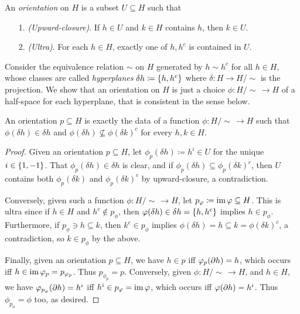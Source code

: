 \documentclass{amsart}
\begin{document}
    \begin{definition}
        An \textit{orientation} on $H$ is a subset $U\subseteq H$ such that
        \begin{enumerate}
            \item[1.] \textit{(Upward-closure)}. If $h\in U$ and $k\in H$ contains $h$, then $k\in U$.
            \item[2.] \textit{(Ultra)}. For each $h\in H$, exactly one of $h,h^c$ is contained in $U$.
        \end{enumerate}
    \end{definition}

    Consider the equivalence relation $\sim$ on $H$ generated by $h\sim h^c$ for all $h\in H$, whose classes are called \textit{hyperplanes} $\delta h\coloneqq\left\{h,h^c\right\}$ where $\delta:H\to H/\!\sim$ is the projection. We show that an orientation on $H$ is just a choice $\phi:H/\!\sim\,\to H$ of a half-space for each hyperplane, that is consistent in the sense below.

    \begin{proposition}
        An orientation $p\subseteq H$ is exactly the data of a function $\phi:H/\!\sim\,\to H$ such that $\phi(\delta h)\in\delta h$ and $\phi(\delta h)\not\subseteq\phi(\delta k)^c$ for every $h,k\in H$.
    \end{proposition}
    \begin{proof}
        Given an orientation $p\subseteq H$, let $\phi_p(\delta h)\coloneqq h^i\in U$ for the unique $i\in\left\{1,-1\right\}$. That $\phi_p(\delta h)\in\delta h$ is clear, and if $\phi_p(\delta h)\subseteq\phi_p(\delta k)^c$, then $U$ contains both $\phi_p(\delta k)$ and $\phi_p(\delta k)^c$ by upward-closure, a contradiction.

        Conversely, given such a function $\phi:H/\!\sim\,\to H$, let $p_\varphi\coloneqq\operatorname{im}\varphi\subseteq H$. This is ultra since if $h\in H$ and $h^c\not\in p_\phi$, then $\varphi(\delta h)\in\delta h=\left\{h,h^c\right\}$ implies $h\in p_\phi$. Furthermore, if $p_\phi\ni h\subseteq k$, then $k^c\in p_\phi$ implies $\phi(\delta h)=h\subseteq k=\phi(\delta k)^c$, a contradiction, so $k\in p_\phi$ by the above.

        Finally, given an orientation $p\subseteq H$, we have $h\in p$ iff $\varphi_p(\partial h)=h$, which occurs iff $h\in\operatorname{im}\varphi_p=p_{\varphi_p}$. Thus $p_{\phi_p}=p$. Conversely, given $\phi:H/\!\sim\,\to H$, and $h\in H$, we have $\varphi_{p_{\varphi}}(\partial h)=h^i$ iff $h^i\in p_\varphi=\operatorname{im}\varphi$, which occurs iff $\varphi(\partial h)=h^i$. Thus $\phi_{p_\phi}=\phi$ too, as desired.
    \end{proof}
\end{document}
